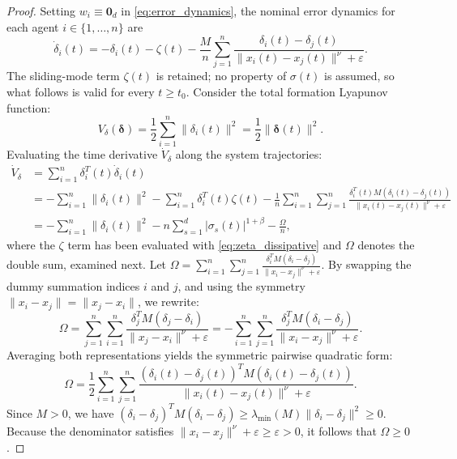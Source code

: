 \documentclass[11pt]{article}
\begin{document}
\begin{proof}
Setting $w_i \equiv \mathbf{0}_d$ in \eqref{eq:error_dynamics}, the nominal error dynamics for each agent $i \in \{1, \dots, n\}$ are
\begin{equation}
\dot{\delta}_i(t) = -\delta_i(t) - \zeta(t) - \frac{M}{n}\sum_{j=1}^{n} \frac{\delta_i(t) - \delta_j(t)}{\|x_i(t) - x_j(t)\|^\nu + \varepsilon}.
\end{equation}
The sliding-mode term $\zeta(t)$ is retained; no property of $\sigma(t)$ is assumed, so what follows is valid for every $t \ge t_0$.
Consider the total formation Lyapunov function:
\begin{equation}
V_\delta(\boldsymbol{\delta}) = \frac{1}{2}\sum_{i=1}^{n} \|\delta_i(t)\|^2 = \frac{1}{2}\|\boldsymbol{\delta}(t)\|^2.
\end{equation}
Evaluating the time derivative $\dot{V}_\delta$ along the system trajectories:
\begin{align}
\dot{V}_\delta &= \sum_{i=1}^{n} \delta_i^T(t) \dot{\delta}_i(t) \nonumber \\
&= -\sum_{i=1}^{n} \|\delta_i(t)\|^2 - \sum_{i=1}^{n}\delta_i^T(t)\zeta(t) - \frac{1}{n}\sum_{i=1}^{n}\sum_{j=1}^{n} \frac{\delta_i^T(t) M (\delta_i(t) - \delta_j(t))}{\|x_i(t) - x_j(t)\|^\nu + \varepsilon} \nonumber \\
&= -\sum_{i=1}^{n} \|\delta_i(t)\|^2 - n\sum_{s=1}^{d}|\sigma_s(t)|^{1+\beta} - \frac{\Omega}{n},
\label{eq:vdelta_dot_expanded}
\end{align}
where the $\zeta$ term has been evaluated with \eqref{eq:zeta_dissipative} and $\Omega$ denotes the double sum, examined next.
Let $\Omega = \sum_{i=1}^{n}\sum_{j=1}^{n} \frac{\delta_i^T M (\delta_i - \delta_j)}{\|x_i - x_j\|^\nu + \varepsilon}$. By swapping the dummy summation indices $i$ and $j$, and using the symmetry $\|x_i - x_j\| = \|x_j - x_i\|$, we rewrite:
\begin{equation}
\Omega = \sum_{j=1}^{n}\sum_{i=1}^{n} \frac{\delta_j^T M (\delta_j - \delta_i)}{\|x_j - x_i\|^\nu + \varepsilon} = -\sum_{i=1}^{n}\sum_{j=1}^{n} \frac{\delta_j^T M (\delta_i - \delta_j)}{\|x_i - x_j\|^\nu + \varepsilon}.
\end{equation}
Averaging both representations yields the symmetric pairwise quadratic form:
\begin{equation}
\Omega = \frac{1}{2}\sum_{i=1}^{n}\sum_{j=1}^{n} \frac{(\delta_i(t) - \delta_j(t))^T M (\delta_i(t) - \delta_j(t))}{\|x_i(t) - x_j(t)\|^\nu + \varepsilon}.
\end{equation}
Since $M > 0$, we have $(\delta_i - \delta_j)^T M (\delta_i - \delta_j) \ge \lambda_{\min}(M)\|\delta_i - \delta_j\|^2 \ge 0$. Because the denominator satisfies $\|x_i - x_j\|^\nu + \varepsilon \ge \varepsilon > 0$, it follows that $\Omega \ge 0$. 


\end{proof}
\end{document}
